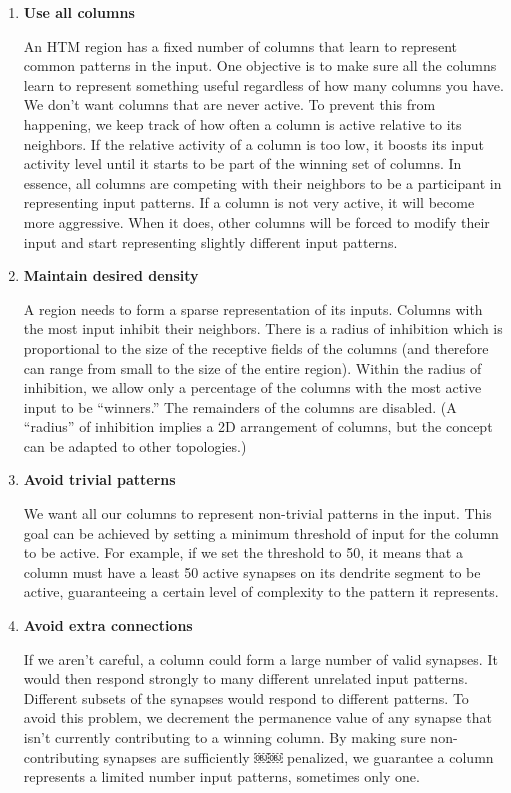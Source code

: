 \documentclass{report}
\begin{document}
\begin{enumerate}
\item {\bf Use all columns}

An HTM region has a fixed number of columns that learn to represent
common patterns in the input. One objective is to make sure all the
columns learn to represent something useful regardless of how many
columns you have. We don't want columns that are never active. To
prevent this from happening, we keep track of how often a column is
active relative to its neighbors. If the relative activity of a column
is too low, it boosts its input activity level until it starts to be
part of the winning set of columns. In essence, all columns are
competing with their neighbors to be a participant in representing
input patterns. If a column is not very active, it will become more
aggressive. When it does, other columns will be forced to modify their
input and start representing slightly different input patterns.

\item {\bf Maintain desired density}

A region needs to form a sparse representation of its inputs. Columns
with the most input inhibit their neighbors. There is a radius of
inhibition which is proportional to the size of the receptive fields
of the columns (and therefore can range from small to the size of the
entire region). Within the radius of inhibition, we allow only a
percentage of the columns with the most active input to be
``winners.'' The remainders of the columns are disabled. (A ``radius''
of inhibition implies a 2D arrangement of columns, but the concept can
be adapted to other topologies.)

\item {\bf Avoid trivial patterns}

We want all our columns to represent non-trivial patterns in the
input. This goal can be achieved by setting a minimum threshold of
input for the column to be active. For example, if we set the
threshold to 50, it means that a column must have a least 50 active
synapses on its dendrite segment to be active, guaranteeing a certain
level of complexity to the pattern it represents.

\item {\bf Avoid extra connections}

If we aren't careful, a column could form a large number of valid
synapses. It would then respond strongly to many different unrelated
input patterns. Different subsets of the synapses would respond to
different patterns. To avoid this problem, we decrement the permanence
value of any synapse that isn't currently contributing to a winning
column. By making sure non-contributing synapses are sufficiently ￼￼
penalized, we guarantee a column represents a limited number input
patterns, sometimes only one.


\end{enumerate}
\end{document}
